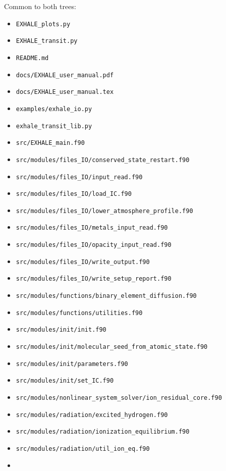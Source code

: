 \documentclass[english,a4paper]{my_memo}
\providecommand{\tightlist}{\setlength{\itemsep}{0pt}\setlength{\parskip}{0pt}}
\begin{document}
Common to both trees:

\begin{itemize}
\tightlist
\item
  \texttt{EXHALE\_plots.py}
\item
  \texttt{EXHALE\_transit.py}
\item
  \texttt{README.md}
\item
  \texttt{docs/EXHALE\_user\_manual.pdf}
\item
  \texttt{docs/EXHALE\_user\_manual.tex}
\item
  \texttt{examples/exhale\_io.py}
\item
  \texttt{exhale\_transit\_lib.py}
\item
  \texttt{src/EXHALE\_main.f90}
\item
  \texttt{src/modules/files\_IO/conserved\_state\_restart.f90}
\item
  \texttt{src/modules/files\_IO/input\_read.f90}
\item
  \texttt{src/modules/files\_IO/load\_IC.f90}
\item
  \texttt{src/modules/files\_IO/lower\_atmosphere\_profile.f90}
\item
  \texttt{src/modules/files\_IO/metals\_input\_read.f90}
\item
  \texttt{src/modules/files\_IO/opacity\_input\_read.f90}
\item
  \texttt{src/modules/files\_IO/write\_output.f90}
\item
  \texttt{src/modules/files\_IO/write\_setup\_report.f90}
\item
  \texttt{src/modules/functions/binary\_element\_diffusion.f90}
\item
  \texttt{src/modules/functions/utilities.f90}
\item
  \texttt{src/modules/init/init.f90}
\item
  \texttt{src/modules/init/molecular\_seed\_from\_atomic\_state.f90}
\item
  \texttt{src/modules/init/parameters.f90}
\item
  \texttt{src/modules/init/set\_IC.f90}
\item
  \texttt{src/modules/nonlinear\_system\_solver/ion\_residual\_core.f90}
\item
  \texttt{src/modules/radiation/excited\_hydrogen.f90}
\item
  \texttt{src/modules/radiation/ionization\_equilibrium.f90}
\item
  \texttt{src/modules/radiation/util\_ion\_eq.f90}
\item

\end{itemize}
\end{document}
